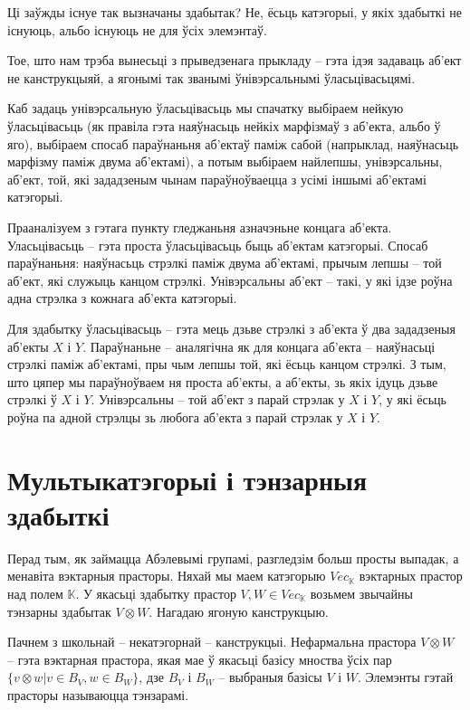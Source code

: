 \documentclass[a4paper,12pt]{book}
\begin{document}
Ці заўжды існуе так вызначаны здабытак? Не, ёсьць катэгорыі, у якіх
здабыткі не існуюць, альбо існуюць не для ўсіх элемэнтаў.

Тое, што нам трэба вынесьці з прыведзенага прыкладу -- гэта ідэя
задаваць аб'ект не канструкцыяй, а ягонымі так званымі ўнівэрсальнымі
ўласьцівасьцямі.

Каб задаць унівэрсальную ўласьцівасьць мы спачатку выбіраем нейкую
ўласьцівасьць (як правіла гэта наяўнасьць нейкіх марфізмаў з аб'екта,
альбо ў яго), выбіраем спосаб параўнаньня аб'ектаў паміж сабой
(напрыклад, наяўнасьць марфізму паміж двума аб'ектамі), а потым
выбіраем найлепшы, унівэрсальны, аб'ект, той, які зададзеным чынам
параўноўваецца з усімі іншымі аб'ектамі катэгорыі.

Прааналізуем з гэтага пункту гледжаньня азначэньне концага
аб'екта. Уласьцівасьць -- гэта проста ўласьцівасьць быць аб'ектам
катэгорыі. Спосаб параўнаньня: наяўнасьць стрэлкі паміж двума
аб'ектамі, прычым лепшы -- той аб'ект, які служыць канцом
стрэлкі. Унівэрсальны аб'ект -- такі, у які ідзе роўна адна стрэлка з
кожнага аб'екта катэгорыі.

Для здабытку ўласьцівасьць -- гэта мець дзьве стрэлкі з аб'екта ў два
зададзеныя аб'екты $X$ і $Y$. Параўнаньне -- аналягічна як для концага
аб'екта
-- наяўнасьці стрэлкі паміж аб'ектамі, пры чым лепшы той, які ёсьць
канцом стрэлкі. З тым, што цяпер мы параўноўваем ня проста аб'екты, а
аб'екты, зь якіх ідуць дзьве стрэлкі ў $X$ і $Y$.
Унівэрсальны -- той аб'ект з парай стрэлак у $X$ і $Y$, у які ёсьць роўна
па адной стрэлцы зь любога аб'екта з парай стрэлак у $X$ і $Y$.

\section{Мультыкатэгорыі і тэнзарныя здабыткі}

Перад тым, як займацца Абэлевымі групамі, разгледзім больш просты
выпадак, а менавіта вэктарныя прасторы. Няхай мы маем катэгорыю
$Vec_{\mathbb{K}}$ вэктарных прастор
над полем $\mathbb{K}$. У якасьці здабытку прастор $V, W \in
Vec_{\mathbb{K}}$ возьмем звычайны тэнзарны здабытак $V \otimes
W$. Нагадаю ягоную канструкцыю.

Пачнем з школьнай -- некатэгорнай -- канструкцыі. Нефармальна прастора
$V \otimes W$ -- гэта вэктарная прастора, якая мае ў якасьці базісу
мноства ўсіх пар $\{v \otimes w|v \in B_V, w \in B_W\}$, дзе $B_V$ і
$B_W$ -- выбраныя базісы $V$ і $W$. Элемэнты гэтай
прасторы называюцца тэнзарамі.
\end{document}
